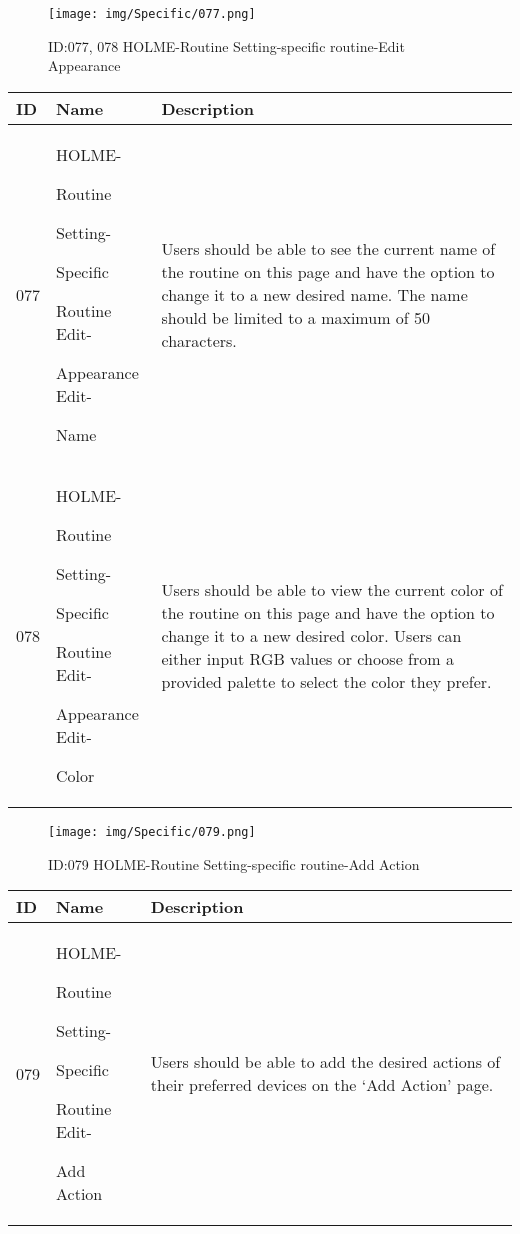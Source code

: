 \documentclass[conference]{IEEEtran}
\begin{document}
\begin{enumerate}
\begin{figure}[h]
\centering                                         
\texttt{[image: img/Specific/077.png]}
\caption{ID:077, 078 HOLME-Routine Setting-specific routine-Edit Appearance}
\end{figure}
\begin{table}[h]
\def\arraystretch{1.2} \small
    \begin{tabular}{|p{1cm}|p{1.8cm}|p{5.0cm}|}
        \hline
        ID & Name & Description\\ \hline
         077  \par  & HOLME-\par Routine \par Setting- \par Specific  \par Routine Edit- \par Appearance Edit- \par Name & 
         Users should be able to see the current name of the routine on this page and have the option to change it to a new desired name. The name should be limited to a maximum of 50 characters.
         \\ \hline
         078  \par  & HOLME-\par Routine \par Setting- \par Specific  \par Routine Edit- \par Appearance Edit- \par Color & 
        Users should be able to view the current color of the routine on this page and have the option to change it to a new desired color. Users can either input RGB values or choose from a provided palette to select the color they prefer.
         \\ \hline
    \end{tabular}
\end{table}

\begin{figure}[h]
\centering                                         
\texttt{[image: img/Specific/079.png]}
\caption{ID:079 HOLME-Routine Setting-specific routine-Add Action}
\end{figure}
\begin{table}[h]
\def\arraystretch{1.2} \small
    \begin{tabular}{|p{1cm}|p{1.8cm}|p{5.0cm}|}
        \hline
        ID & Name & Description\\ \hline
         079 \par  & HOLME-\par Routine \par Setting- \par Specific  \par Routine Edit- \par Add Action & 
         Users should be able to add the desired actions of their preferred devices on the `Add Action' page.
         \\ \hline
    \end{tabular}
\end{table}


\end{enumerate}
\end{document}
